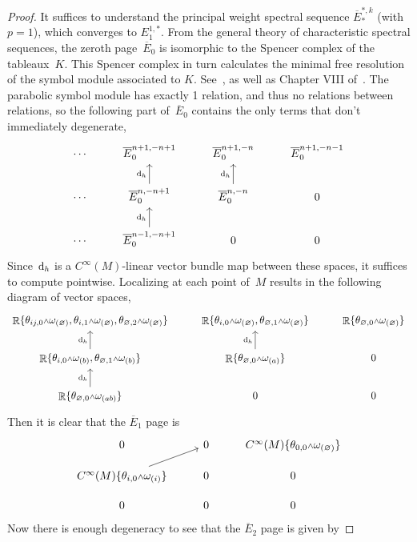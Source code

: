 \documentclass[pdftex]{sigma}
\DeclareMathOperator{\R}{\mathbb{R}}
\renewcommand{\d}{{\rm d}}
\newcommand{\w}{{\mathchoice{\,{\scriptstyle\wedge}\,}{{\scriptstyle\wedge}}
 {{\scriptscriptstyle\wedge}}{{\scriptscriptstyle\wedge}}}}
\newcommand{\thetas}[1]{\theta_{#1}}
\newcommand{\omegas}[1]{\omega_{(#1)}}
\renewcommand{\dh}{\ensuremath{\hspace{1pt} \d_h}}
\newcommand{\cMinfty}{C^\infty(M)}
\numberwithin{equation}{section}
\begin{document}
\begin{proof}It suffices to understand the principal weight spectral sequence $\overline{E}_*^{*,k}$ (with $p =1$), which converges to $E_1^{1,*}$.
 From the general theory of characteristic spectral sequences, the zeroth page~$\overline{E}_0$ is isomorphic to the Spencer complex of the tableaux~$K$. This Spencer complex in turn calculates the minimal free resolution of the symbol module associated to $K$. See~\cite{Characteristic_Cohomology_I}, as well as Chapter VIII of~\cite{BCGGG}. The parabolic symbol module has exactly 1 relation, and thus no relations between relations, so the following part of~$\overline{E}_0$ contains the only terms that don't immediately degenerate,
 \[
 \begin{tikzcd}
 \cdots & \overline{E}_0^{n+1,-n+1} & \overline{E}_0^{n+1,-n} & \overline{E}_0^{n+1,-n-1} \\
 \cdots & \overline{E}_0^{n,-n+1} \ar[u, "\dh"] & \overline{E}_0^{n,-n} \ar[u, "\dh"] & 0 \\
 \cdots & \overline{E}_0^{n-1,-n+1} \ar[u, "\dh"] & 0 & 0
 \end{tikzcd}
 \]
Since $\dh$ is a $\cMinfty$-linear vector bundle map between these spaces, it suffices to compute pointwise. Localizing at each point of~$M$ results in the following diagram of vector spaces,
\[
\begin{tikzcd}
\R\{\thetas{ij,0}\w\omegas{\varnothing},\thetas{i,1}\w\omegas{\varnothing},\thetas{\varnothing,2}\w\omegas{\varnothing}\} & \R\{\thetas{i,0}\w\omegas{\varnothing},\thetas{\varnothing,1}\w\omegas{\varnothing}\} & \R\{\thetas{\varnothing,0}\w\omegas{\varnothing}\} \\
\R\{\thetas{i,0}\w\omegas{b},\thetas{\varnothing,1}\w\omegas{b}\} \ar[u, "\dh"] & \R\{\thetas{\varnothing,0}\w\omegas{a}\}\ar[u, "\dh"] & 0 \\
\R\{\thetas{\varnothing,0}\w\omegas{ab}\} \ar[u, "\dh"] & 0 & 0
\end{tikzcd}
\]
Then it is clear that the $\overline{E}_1$ page is
\begin{equation}\label{eq:E_1-bar page spectral sequence}
 \begin{tikzcd}
 0 & 0 & \cMinfty\{\thetas{0,0}\w\omegas{\varnothing}\} \\[-2ex]
 \cMinfty\{\thetas{i,0}\w\omegas{i}\} \ar[ur] & 0 & 0 \\[-2ex]
 0 & 0 & 0
 \end{tikzcd}
\end{equation}
Now there is enough degeneracy to see that the $\overline{E}_2$ page is given by

\end{proof}
\end{document}

